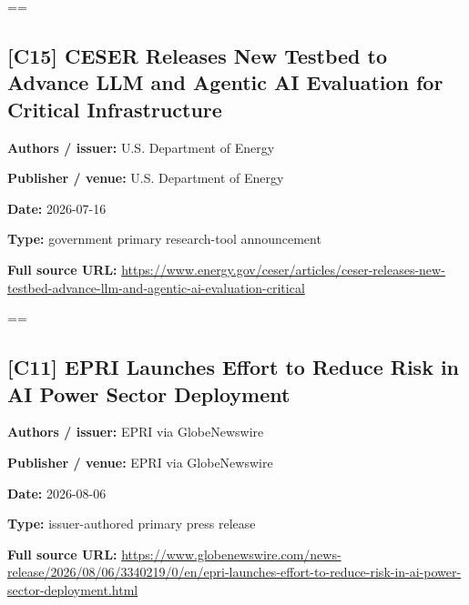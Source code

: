 \documentclass[10pt,letterpaper]{article}
\begin{document}
\setbox\readingEntry=\vbox\bgroup\hsize=\linewidth\subsection*{[C15] CESER Releases New Testbed to Advance LLM and Agentic AI Evaluation for Critical Infrastructure}
\textbf{Authors / issuer:} U.S. Department of Energy\par
\textbf{Publisher / venue:} U.S. Department of Energy\par
\textbf{Date:} 2026-07-16\par
\textbf{Type:} government primary research-tool announcement\par
\textbf{Full source URL:} \href{https://www.energy.gov/ceser/articles/ceser-releases-new-testbed-advance-llm-and-agentic-ai-evaluation-critical}{\small\ttfamily https:/\allowbreak{}/\allowbreak{}www.\allowbreak{}energy.\allowbreak{}gov/\allowbreak{}ceser/\allowbreak{}articles/\allowbreak{}ceser-\allowbreak{}releases-\allowbreak{}new-\allowbreak{}testbed-\allowbreak{}advance-\allowbreak{}llm-\allowbreak{}and-\allowbreak{}agentic-\allowbreak{}ai-\allowbreak{}evaluation-\allowbreak{}critical}\par
\egroup\par\noindent\box\readingEntry\par\medskip
\setbox\readingEntry=\vbox\bgroup\hsize=\linewidth\subsection*{[C11] EPRI Launches Effort to Reduce Risk in AI Power Sector Deployment}
\textbf{Authors / issuer:} EPRI via GlobeNewswire\par
\textbf{Publisher / venue:} EPRI via GlobeNewswire\par
\textbf{Date:} 2026-08-06\par
\textbf{Type:} issuer-authored primary press release\par
\textbf{Full source URL:} \href{https://www.globenewswire.com/news-release/2026/08/06/3340219/0/en/epri-launches-effort-to-reduce-risk-in-ai-power-sector-deployment.html}{\small\ttfamily https:/\allowbreak{}/\allowbreak{}www.\allowbreak{}globenewswire.\allowbreak{}com/\allowbreak{}news-\allowbreak{}release/\allowbreak{}2026/\allowbreak{}08/\allowbreak{}06/\allowbreak{}3340219/\allowbreak{}0/\allowbreak{}en/\allowbreak{}epri-\allowbreak{}launches-\allowbreak{}effort-\allowbreak{}to-\allowbreak{}reduce-\allowbreak{}risk-\allowbreak{}in-\allowbreak{}ai-\allowbreak{}power-\allowbreak{}sector-\allowbreak{}deployment.\allowbreak{}html}\par
\end{document}
